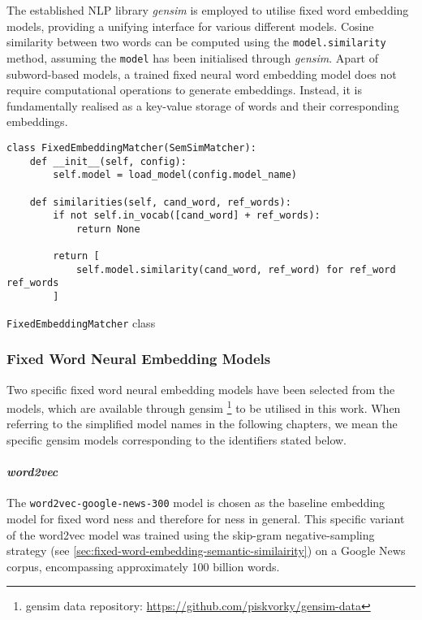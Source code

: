\documentclass[11pt]{scrreprt}
\let\cite\parencite  %
\begin{document}
{The established NLP library \textit{gensim} \cite{rehurek_lrec} is employed to utilise fixed word embedding models, providing a unifying interface for various different models. Cosine similarity between two words can be computed using the \texttt{model.similarity} method, assuming the \texttt{model} has been initialised through \textit{gensim}. Apart of subword-based models, a trained fixed neural word embedding model does not require computational operations to generate embeddings. Instead, it is fundamentally realised as a key-value storage of words and their corresponding embeddings.



\begin{pseudo}
\begin{lstlisting}
class FixedEmbeddingMatcher(SemSimMatcher):    
    def __init__(self, config):
        self.model = load_model(config.model_name)

    def similarities(self, cand_word, ref_words):
        if not self.in_vocab([cand_word] + ref_words):
            return None

        return [
            self.model.similarity(cand_word, ref_word) for ref_word ref_words
        ]
\end{lstlisting}
\caption{\texttt{FixedEmbeddingMatcher} class}
\label{psd:fixedmatcher-class}
\end{pseudo}


\subsubsection{Fixed Word Neural Embedding Models}
Two specific fixed word neural embedding models have been selected from the models, which are available through gensim
\footnote{gensim data repository: \url{https://github.com/piskvorky/gensim-data}} 
to be utilised in this work. When referring to the simplified model names in the following chapters, we mean the specific gensim models corresponding to the identifiers stated below.

\paragraph{\textit{word2vec}} The \texttt{word2vec-google-news-300} model is chosen as the baseline embedding model for fixed word \gls{ness} and therefore for \gls{ness} in general. This specific variant of the word2vec model was trained using the skip-gram negative-sampling strategy (see \cref{sec:fixed-word-embedding-semantic-similairity}) on a Google News corpus, encompassing approximately 100 billion words.

}
\end{document}
